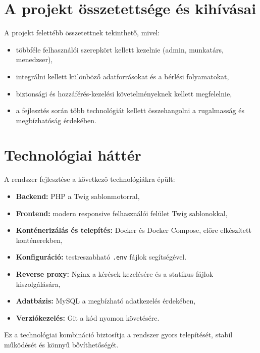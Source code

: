\section{A projekt összetettsége és kihívásai}

A projekt felettébb összetettnek tekinthető, mivel:
\begin{itemize}
    \item többféle felhasználói szerepkört kellett kezelnie (admin, munkatárs, menedzser),
    \item integrálni kellett különböző adatforrásokat és a bérlési folyamatokat,
    \item biztonsági és hozzáférés-kezelési követelményeknek kellett megfelelnie,
    \item a fejlesztés során több technológiát kellett összehangolni a rugalmasság és megbízhatóság érdekében.
\end{itemize}

\section{Technológiai háttér}

A rendszer fejlesztése a következő technológiákra épült:
\begin{itemize}
    \item \textbf{Backend:} PHP a Twig sablonmotorral,
    \item \textbf{Frontend:} modern responsive felhasználói felület Twig sablonokkal,
    \item \textbf{Konténerizálás és telepítés:} Docker és Docker Compose, előre elkészített konténerekben,
    \item \textbf{Konfiguráció:} testreszabható \texttt{.env} fájlok segítségével.
    \item \textbf{Reverse proxy:} Nginx a kérések kezelésére és a statikus fájlok kiszolgálására,
    \item \textbf{Adatbázis:} MySQL a megbízható adatkezelés érdekében,
    \item \textbf{Verziókezelés:} Git a kód nyomon követésére.
\end{itemize}

Ez a technológiai kombináció biztosítja a rendszer gyors telepítését, stabil működését és könnyű bővíthetőségét.
